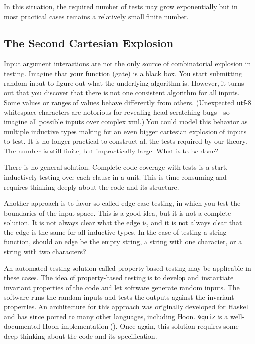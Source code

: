 \documentclass[twoside]{article}
\begin{document}
In this situation, the required number of tests may grow exponentially but in most practical cases remains a relatively small finite number.

\subsection{The Second Cartesian Explosion}

Input argument interactions are not the only source of combinatorial explosion in testing. Imagine that your function (gate) is a black box. You start submitting random input to figure out what the underlying algorithm is. However, it turns out that you discover that there is not one consistent algorithm for all inputs. Some values or ranges of values behave differently from others. (Unexpected {\sc utf}-8 whitespace characters are notorious for revealing head-scratching bugs—so imagine all possible inputs over complex {\sc xml}.) You could model this behavior as multiple inductive types making for an even bigger cartesian explosion of inputs to test. It is no longer practical to construct all the tests required by our theory. The number is still finite, but impractically large. What is to be done?

There is no general solution. Complete code coverage with tests is a start, inductively testing over each clause in a unit. This is time-consuming and requires thinking deeply about the code and its structure.

Another approach is to favor so-called edge case testing, in which you test the boundaries of the input space. This is a good idea, but it is not a complete solution. It is not always clear what the edge is, and it is not always clear that the edge is the same for all inductive types. In the case of testing a string function, should an edge be the empty string, a string with one character, or a string with two characters? 

An automated testing solution called property-based testing may be applicable in these cases. The idea of property-based testing is to develop and instantiate invariant properties of the code and let software generate random inputs. The software runs the random inputs and tests the outputs against the invariant properties. An architecture for this approach was originally developed for Haskell and has since ported to many other languages, including Hoon.  \lstinline[style=inlinecode]{%quiz} is a well-documented Hoon implementation ().  Once again, this solution requires some deep thinking about the code and its specification.
\end{document}
